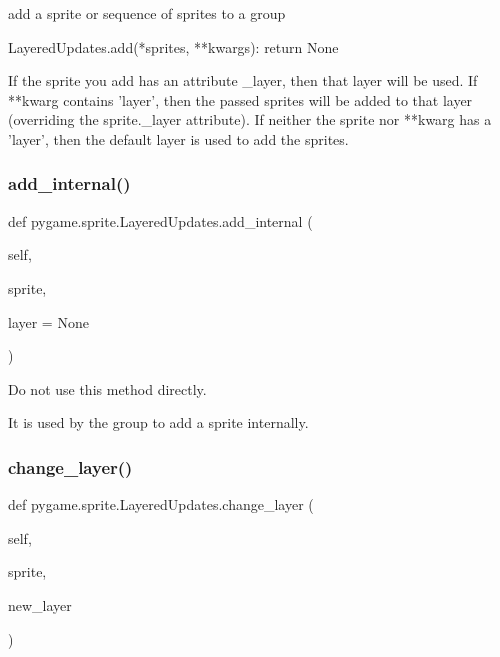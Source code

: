 \begin{DoxyVerb}add a sprite or sequence of sprites to a group

LayeredUpdates.add(*sprites, **kwargs): return None

If the sprite you add has an attribute _layer, then that layer will be
used. If **kwarg contains 'layer', then the passed sprites will be
added to that layer (overriding the sprite._layer attribute). If
neither the sprite nor **kwarg has a 'layer', then the default layer is
used to add the sprites.\end{DoxyVerb}
 \mbox{\label{classpygame_1_1sprite_1_1_layered_updates_a44b2d26ee1704a97a9367f60954f703d}} 
\subsubsection{\texorpdfstring{add\+\_\+internal()}{add\_internal()}}
{\footnotesize\ttfamily def pygame.\+sprite.\+Layered\+Updates.\+add\+\_\+internal (\begin{DoxyParamCaption}\item[{}]{self,  }\item[{}]{sprite,  }\item[{}]{layer = {\ttfamily None} }\end{DoxyParamCaption})}

\begin{DoxyVerb}Do not use this method directly.

It is used by the group to add a sprite internally.\end{DoxyVerb}
 \mbox{\label{classpygame_1_1sprite_1_1_layered_updates_abf1df6b1a5ed9593d8c8d984105e3c56}} 
\subsubsection{\texorpdfstring{change\+\_\+layer()}{change\_layer()}}
{\footnotesize\ttfamily def pygame.\+sprite.\+Layered\+Updates.\+change\+\_\+layer (\begin{DoxyParamCaption}\item[{}]{self,  }\item[{}]{sprite,  }\item[{}]{new\+\_\+layer }\end{DoxyParamCaption})}

